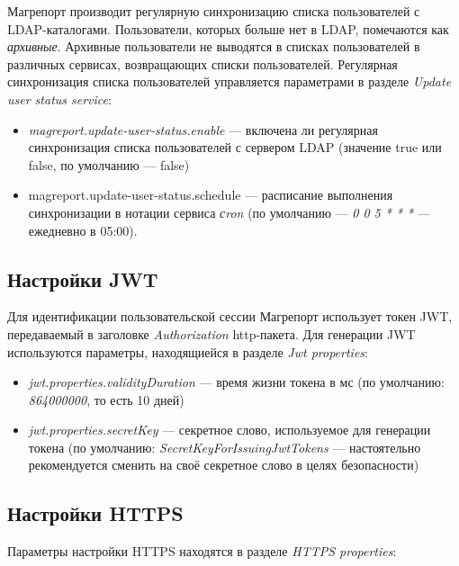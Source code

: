 \documentclass[../user-manual.tex]{subfiles}
\begin{document}
	Магрепорт производит регулярную синхронизацию списка пользователей с LDAP-каталогами. Пользователи, которых больше нет в LDAP, помечаются как \textit{архивные}. Архивные пользователи не выводятся в списках пользователей в различных сервисах, возвращающих списки пользователей. Регулярная синхронизация списка пользователей управляется параметрами в разделе \textit{Update user status service}:
		
	\begin{itemize}
		\item \textit{magreport.update-user-status.enable} --- включена ли регулярная синхронизация списка пользователей с сервером LDAP (значение true или false, по умолчанию --- false)
		
		\item magreport.update-user-status.schedule --- расписание выполнения синхронизации в нотации сервиса \textit{сron} (по умолчанию --- \textit{0 0 5 * * *} --- ежедневно в 05:00).
	\end{itemize}		
	
	\subsection{Настройки JWT}
	
	Для идентификации пользовательской сессии Магрепорт использует токен JWT, передаваемый в заголовке \textit{Authorization} http-пакета. Для генерации JWT используются параметры, находящиейся в разделе \textit{Jwt properties}:
	
	\begin{itemize}
		\item \textit{jwt.properties.validityDuration} --- время жизни токена в мс (по умолчанию: \textit{864000000}, то есть 10 дней)
		
		\item \textit{jwt.properties.secretKey} --- секретное слово, используемое для генерации токена (по умолчанию: \textit{SecretKeyForIssuingJwtTokens} --- настоятельно рекомендуется сменить на своё секретное слово в целях безопасности)
	\end{itemize}
	
	\subsection{Настройки HTTPS}\label{subsection:https-settings}
	
	Параметры настройки HTTPS находятся в разделе \textit{HTTPS properties}:
	
\end{document}
